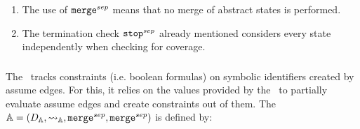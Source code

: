 \begin{enumerate}[leftmargin=*, label=\arabic*.]
\item The use of $\texttt{merge}^{sep}$ means that no merge of abstract states is performed.
\item The termination check $\texttt{stop}^{sep}$ already mentioned considers every state independently when checking for coverage.

\end{enumerate}

\subsubsection{\ConstraintsCPA}

The \constraintsCPA\ tracks constraints (i.e. boolean formulas) on symbolic identifiers created by assume edges.
For this, it relies on the values provided by the \symbolicValueAnalysisCPA\ to partially evaluate assume edges and create constraints out of them.
The \constraintsCPA\ $\mathbb{A} = (D_{\mathbb{A}}, \rightsquigarrow_{\mathbb{A}}, \texttt{merge}^{sep}, \texttt{merge}^{sep})$ is defined by:
